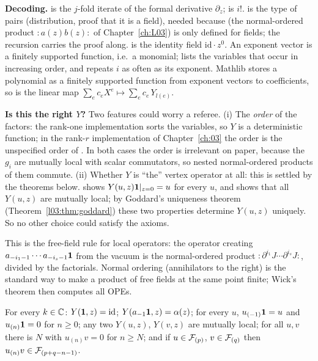 \begin{dictionary}
\textbf{Decoding.}  is the $j$-fold iterate of the formal derivative $\partial_z$;
 is $i!$.  is the type of pairs (distribution, proof that it
is a field), needed because  (the normal-ordered product ${:}a(z)b(z){:}$ of
Chapter~\ref{ch:L03}) is only defined for fields; the recursion carries the
proof along.  is the identity field $\mathrm{id}\cdot z^0$. An exponent vector
 is a finitely supported function, i.e.\ a monomial;  lists
the variables that occur in increasing order, and  repeats $i$ as often as its
exponent. Mathlib stores a polynomial as a finitely supported function from exponent vectors to
coefficients, so  is the linear map
$\sum_ec_eX^e\mapsto\sum_ec_e\,Y_{l(e)}$.

\textbf{Is this the right $Y$?} Two features could worry a referee. (i) The \emph{order} of the factors:
the rank-one implementation sorts the variables, so $Y$ is a deterministic function; in the rank-$r$
implementation of Chapter~\ref{ch:03} the order is the unspecified order of . In both
cases the order is irrelevant on paper, because the $g_i$ are mutually local with scalar commutators, so
nested normal-ordered products of them commute. (ii) Whether $Y$ is ``the'' vertex operator at all: this is
settled by the theorems below.  shows $Y(u,z)\mathbf{1}|_{z=0}=u$ for every $u$, and
 shows that all $Y(u,z)$ are mutually local; by Goddard's uniqueness theorem
(Theorem~\ref{l03:thm:goddard}) these two properties determine $Y(u,z)$ uniquely. So no other choice
could satisfy the axioms.
\end{dictionary}

\begin{physics}
This is the free-field rule for local operators: the operator creating $a_{-i_1-1}\cdots a_{-i_s-1}\mathbf{1}$
from the vacuum is the normal-ordered product ${:}\partial^{i_1}J\cdots\partial^{i_s}J{:}$, divided by the
factorials. Normal ordering (annihilators to the right) is the standard way to make a product of free
fields at the same point finite; Wick's theorem then computes all OPEs.
\end{physics}

\begin{theorem}\label{l05:thm:VAaxioms}
For every $k\in{\mathbb{C}}$: $Y(\mathbf{1},z)=\mathrm{id}$; $Y(a_{-1}\mathbf{1},z)=\alpha(z)$; for every $u$,
$u_{(-1)}\mathbf{1}=u$ and $u_{(n)}\mathbf{1}=0$ for $n\ge0$; any two $Y(u,z)$, $Y(v,z)$ are mutually local;
for all $u,v$ there is $N$ with $u_{(n)}v=0$ for $n\ge N$; and if $u\in\mathcal{F}_{(p)}$, $v\in\mathcal{F}_{(q)}$
then $u_{(n)}v\in\mathcal{F}_{(p+q-n-1)}$.
\end{theorem}

